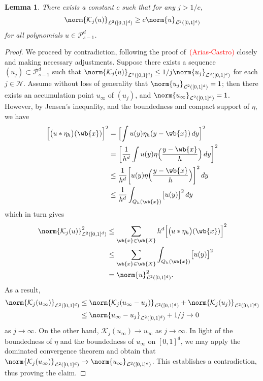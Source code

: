 \documentclass{article}
\newcommand{\1}{\mathbf{1}}
\newcommand{\Leb}{\mathcal{L}}
\theoremstyle{alden}
\theoremstyle{aldenthm}
\newtheorem{lemma}{Lemma}
\theoremstyle{definition}
\theoremstyle{remark}
\begin{document}
\begin{lemma}
	\label{lem:riemann_sums_polynomials}
	There exists a constant $c$ such that for any $j > 1/c$, 
	\begin{equation*}
	\norm{\mathcal{K}_j(u)}_{\Leb^2([0,1]^d)} \geq c \norm{u}_{\Leb^2([0,1]^d)}
	\end{equation*}
	for all polynomials $u \in \mathcal{P}_{s - 1}^d$.
\end{lemma}
\begin{proof}
	We proceed by contradiction, following the proof of~\textcolor{red}{(Arias-Castro)} closely and making necessary adjustments. Suppose there exists a sequence $(u_j) \subset \mathcal{P}_{s - 1}^d$ such that $\norm{\mathcal{K}_j(u)}_{\Leb^2([0,1]^d)} \leq 1/j \norm{u_j}_{\Leb^2([0,1]^d)}$ for each $j \in \mathcal{N}$. Assume without loss of generality that $\norm{u_j}_{\Leb^2([0,1]^d)} = 1$; then there exists an accumulation point $u_{\infty}$ of $(u_j)$, and $\norm{u_{\infty}}_{\Leb^2([0,1]^d)} = 1$. However, by Jensen's inequality, and the boundedness and compact support of $\eta$, we have
	\begin{align*}
	\Bigl[\bigl(u \ast \eta_h\bigr)(\wb{x})\Bigr]^2 & = \Bigl[\int u(y) \eta_h(y - \wb{x}) \,dy \Bigr]^2 \\
	& = \biggl[\frac{1}{h^d}\int u(y) \eta\Bigl(\frac{y - \wb{x}}{h}\Bigr) \,dy \biggr]^2 \\
	& \leq \frac{1}{h^d}  \biggl[u(y) \eta\Bigl(\frac{y - \wb{x}}{h}\Bigr)\biggr]^2 \,dy \\
	& \leq \frac{1}{h^d} \int_{Q_h(\wb{x})} \bigl[u(y)\bigr]^2 \,dy
	\end{align*}
	which in turn gives 
	\begin{align*}
	\norm{\mathcal{K}_j(u)}_{\Leb^2([0,1]^d)}^2 & \leq \sum_{\wb{x} \in \wb{X}} h^d\Bigl[\bigl(u \ast \eta_h\bigr)(\wb{x})\Bigr]^2 \\
	& \leq \sum_{\wb{x} \in \wb{X}}\int_{Q_h(\wb{x})} \bigl[u(y)\bigr]^2 \\
	& = \norm{u}_{\Leb^2([0,1]^d)}^2.
	\end{align*}
	As a result,
	\begin{align*}
	\norm{\mathcal{K}_j(u_{\infty})}_{\Leb^2([0,1]^d)} & \leq \norm{\mathcal{K}_j(u_{\infty} - u_j)}_{\Leb^2([0,1]^d)} + \norm{\mathcal{K}_j(u_j)}_{\Leb^2([0,1]^d)} \\
	& \leq \norm{u_\infty - u_j}_{\Leb^2([0,1]^d)} + 1/j \to 0
	\end{align*}
	as $j \to \infty$. On the other hand, $\mathcal{K}_j(u_{\infty}) \to u_{\infty}$ as $j \to \infty$. In light of the boundedness of $\eta$ and the boundedness of $u_{\infty}$ on $[0,1]^d$, we may apply the dominated convergence theorem and obtain that $\norm{\mathcal{K}_j(u_{\infty})}_{\Leb^2([0,1]^d)} \to \norm{u_{\infty}}_{\Leb^2([0,1]^d)}$. This establishes a contradiction, thus proving the claim.
\end{proof}
\end{document}
